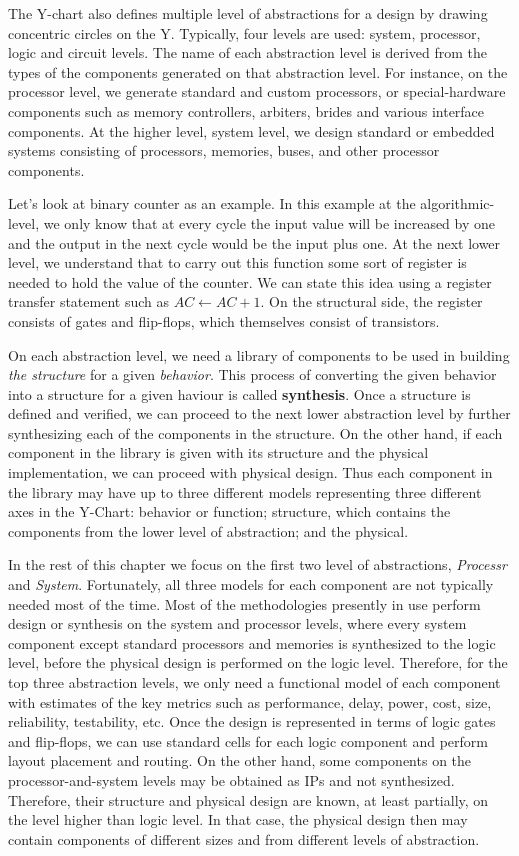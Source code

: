 The Y-chart also defines multiple level of abstractions for a design by drawing concentric circles on the Y. Typically, four levels are used: system, processor, logic and circuit levels.
The name of each abstraction level is derived from the types of the components generated on that abstraction level.
For instance, on the processor level, we generate standard and custom processors, or special-hardware components such as memory controllers, arbiters, brides and various interface components. At the higher level, system level, we design standard or embedded systems consisting of processors, memories, buses, and other processor components.

Let's look at binary counter as an example. In this example at the algorithmic-level, we only know that at every cycle the input value will be increased by one and the output in the next cycle would be the input plus one.
At the next lower level, we understand that to carry out this function some sort of register is needed to hold the value of the counter.
We can state this idea using a register transfer statement such as $AC \leftarrow AC + 1$.
On the structural side, the register consists of gates and flip-flops, which themselves consist of transistors.

On each abstraction level, we need a library of components to be used in building \emph{the structure} for a given \emph{behavior}.
This process of converting the given behavior into a structure for a given haviour is called \textbf{synthesis}.
Once a structure is defined and verified, we can proceed to the next lower abstraction level by further synthesizing each of the components in the structure.
On the other hand, if each component in the library is given with its structure and
the physical implementation, we can proceed with physical design.
Thus each component in the library may have up to three different models representing
three different axes in the Y-Chart: behavior or function; structure, which
contains the components from the lower level of abstraction; and the physical.

In the rest of this chapter we focus on the first two level of abstractions, \textit{Processr} and \textit{System}.
Fortunately, all three models for each component are not typically needed most of the time.
Most of the methodologies presently in use perform design or synthesis on the system and processor levels, where every system component except standard processors and memories is synthesized to the logic level, before the physical design is performed on the logic level.
Therefore, for the top three abstraction levels, we only need a functional model of each component with estimates of the key metrics such as performance, delay, power, cost, size, reliability, testability, etc.
Once the design is represented in terms of logic gates and flip-flops, we can use standard cells for each logic component and perform layout placement and routing.
On the other hand, some components on the processor-and-system levels may be obtained as IPs and not synthesized.
Therefore, their structure and physical design are known, at least partially, on the level higher than logic level.
In that case, the physical design then may contain components of different sizes and from different levels of abstraction.

